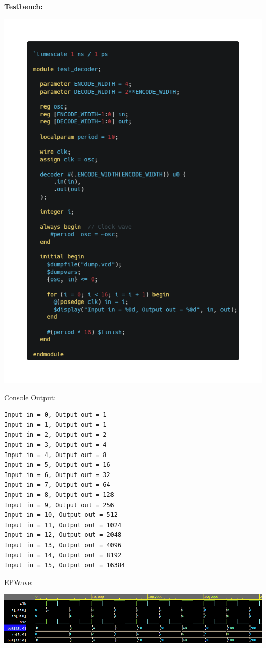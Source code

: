 \documentclass[12pt]{article}
\begin{document}
\pagebreak
\textbf{Testbench:}
\begin{center}
    \includegraphics[width=\linewidth]{images/decoder_tb.png}
\end{center}
Console Output:
\begin{verbatim}
Input in = 0, Output out = 1
Input in = 1, Output out = 1
Input in = 2, Output out = 2
Input in = 3, Output out = 4
Input in = 4, Output out = 8
Input in = 5, Output out = 16
Input in = 6, Output out = 32
Input in = 7, Output out = 64
Input in = 8, Output out = 128
Input in = 9, Output out = 256
Input in = 10, Output out = 512
Input in = 11, Output out = 1024
Input in = 12, Output out = 2048
Input in = 13, Output out = 4096
Input in = 14, Output out = 8192
Input in = 15, Output out = 16384
\end{verbatim}
EPWave:
\begin{center}
    \includegraphics[width=\linewidth]{images/decoder_tb_wave.png}
\end{center}
\pagebreak
\end{document}
